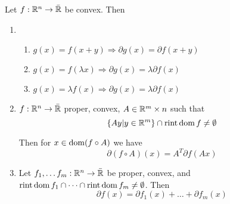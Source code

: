 \begin{proposition}
  Let $f: \mathbb{R}^{n} \rightarrow \bar {\mathbb{R}}$ be convex.  Then
  \begin{enumerate}
  \item
    \begin{enumerate}
    \item $g(x) = f(x + y) \Rightarrow \partial g(x) = \partial
      f(x+y)$
    \item $g(x) = f(\lambda x) \Rightarrow \partial g(x) =
      \lambda \partial f(x)$
    \item $g(x) = \lambda f(x) \Rightarrow \partial g(x) =
      \lambda \partial f(x)$
    \end{enumerate}
  \item $f: \mathbb{R}^{n} \rightarrow \bar {\mathbb{R}}$ proper, convex, $A \in \mathbb{R}^m
    \times n$ such that
    \begin{equation}
      \label{eq:43}
      \{  Ay | y \in \mathbb{R}^{m} \} \cap \operatorname*{rint} \operatorname*{dom} f \neq \emptyset
    \end{equation}

    Then for $x \in \operatorname*{dom} (f \circ A)$ we have
    \begin{equation}
      \label{eq:44}
      \partial (f \circ A)(x) = A^{T} \partial f(Ax)
    \end{equation}
  \item Let $f_{1}, \dots f_{m}: \mathbb{R}^{n} \rightarrow \bar {\mathbb{R}}$ be
    proper, convex, and $\operatorname*{rint} \operatorname*{dom} f_{1} \cap \dots \cap \operatorname*{rint} \operatorname*{dom}
    f_{m} \neq \emptyset$.  Then
    \begin{equation}
      \label{eq:45}
      \partial f(x) = \partial f_{1}(x) + \dots + \partial f_{m}(x)
    \end{equation}
  \end{enumerate}
\end{proposition}

